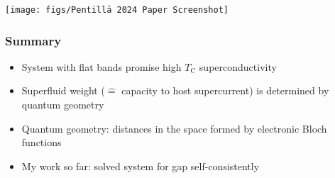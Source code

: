 \documentclass[aspectratio=169]{beamer}
\begin{document}
\begin{frame}
	
	\begin{center}
		\texttt{[image: figs/Pentillä 2024 Paper Screenshot]}
	\end{center}
\end{frame}


\begin{frame}
	\frametitle{Summary}
	
	\begin{itemize}
		\item System with flat bands promise high \(T_{\mathrm{C}}\) superconductivity\pause
		\item Superfluid weight (\(\hat{=}\) capacity to host supercurrent) is determined by quantum geometry\pause
		\item Quantum geometry: distances in the space formed by electronic Bloch functions\pause
		\item My work so far: solved system for gap self-consistently
	\end{itemize}	
\end{frame}

	
	
	
	
	
\end{document}
